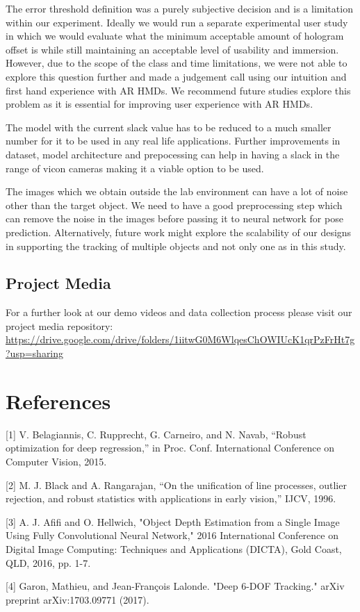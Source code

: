 \documentclass{article}
\begin{document}
The error threshold definition was a purely subjective decision and is a limitation within our experiment. Ideally we would run a separate experimental user study in which we would evaluate what the minimum acceptable amount of hologram offset is while still maintaining an acceptable level of usability and immersion. However, due to the scope of the class and time limitations, we were not able to explore this question further and made a judgement call using our intuition and first hand experience with AR HMDs. We recommend future studies explore this problem as it is essential for improving user experience with AR HMDs.

The model with the current slack value has to be reduced to a much smaller number for it to be used in any real life applications. Further improvements in dataset, model architecture and prepocessing can help in having a slack in the range of vicon cameras making it a viable option to be used.

The images which we obtain outside the lab environment can have a lot of noise other than the target object. We need to have a good preprocessing step which can remove the noise in the images before passing it to neural network for pose prediction. Alternatively, future work might explore the scalability of our designs in supporting the tracking of multiple objects and not only one as in this study.  

\subsection{Project Media}
For a further look at our demo videos and data collection process please visit our project media repository: \url{https://drive.google.com/drive/folders/1iitwG0M6WlqesChOWIUcK1qrPzFrHt7g?usp=sharing}

\section*{References}
[1] V. Belagiannis, C. Rupprecht, G. Carneiro, and N. Navab, “Robust
optimization for deep regression,” in Proc. Conf. International
Conference on Computer Vision, 2015.

[2] M. J. Black and A. Rangarajan, “On the unification of line processes,
outlier rejection, and robust statistics with applications in early vision,”
IJCV, 1996.

[3] A. J. Afifi and O. Hellwich, "Object Depth Estimation from a Single Image Using Fully Convolutional Neural Network," 2016 International Conference on Digital Image Computing: Techniques and Applications (DICTA), Gold Coast, QLD, 2016, pp. 1-7.

[4] Garon, Mathieu, and Jean-François Lalonde. "Deep 6-DOF Tracking." arXiv preprint arXiv:1703.09771 (2017).
\end{document}
